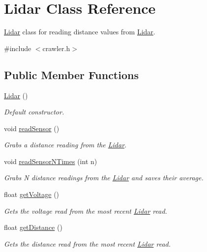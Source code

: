 \hypertarget{classLidar}{\section{Lidar Class Reference}
\label{classLidar}
}


\hyperlink{classLidar}{Lidar} class for reading distance values from \hyperlink{classLidar}{Lidar}.  




{\ttfamily \#include $<$crawler.\-h$>$}

\subsection*{Public Member Functions}
\begin{DoxyCompactItemize}
\item 
\hyperlink{classLidar_acc713b5eb35b95bee2ac4d5396b0fb5b}{Lidar} ()
\begin{DoxyCompactList}\small\item\em Default constructor. \end{DoxyCompactList}\item 
\hypertarget{classLidar_af1a22e6510e774e015f97e90dc8342a5}{void \hyperlink{classLidar_af1a22e6510e774e015f97e90dc8342a5}{read\-Sensor} ()}\label{classLidar_af1a22e6510e774e015f97e90dc8342a5}

\begin{DoxyCompactList}\small\item\em Grabs a distance reading from the \hyperlink{classLidar}{Lidar}. \end{DoxyCompactList}\item 
void \hyperlink{classLidar_a5d067f7656748755ea72ac31a9232ef5}{read\-Sensor\-N\-Times} (int n)
\begin{DoxyCompactList}\small\item\em Grabs N distance readings from the \hyperlink{classLidar}{Lidar} and saves their average. \end{DoxyCompactList}\item 
float \hyperlink{classLidar_a1085539adddae19ee6c3ce70ae4d7481}{get\-Voltage} ()
\begin{DoxyCompactList}\small\item\em Gets the voltage read from the most recent \hyperlink{classLidar}{Lidar} read. \end{DoxyCompactList}\item 
float \hyperlink{classLidar_ab8bb078d9dcff6162ce924fc6d0625d8}{get\-Distance} ()
\begin{DoxyCompactList}\small\item\em Gets the distance read from the most recent \hyperlink{classLidar}{Lidar} read. \end{DoxyCompactList}\end{DoxyCompactItemize}



